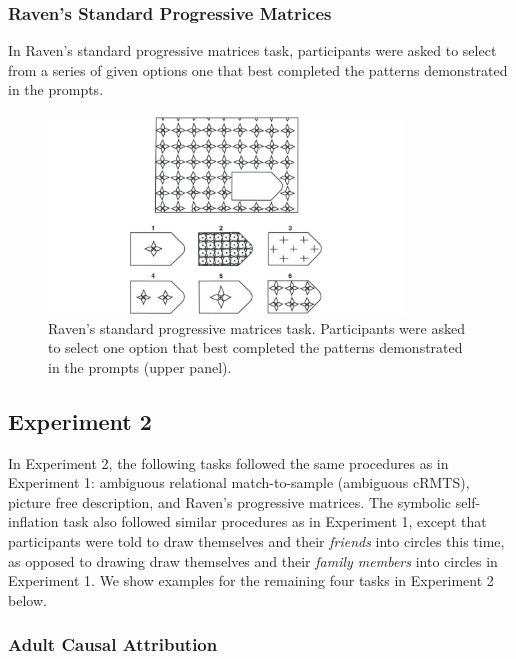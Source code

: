 \documentclass[
  man,floatsintext]{apa6}
\begin{document}
\hypertarget{ravens-standard-progressive-matrices-3}{%
\subsubsection{Raven's Standard Progressive Matrices}\label{ravens-standard-progressive-matrices-3}}

In Raven's standard progressive matrices task, participants were asked to select from a series of given options one that best completed the patterns demonstrated in the prompts.

\begin{figure}[!h]

{\centering \includegraphics[width=1\linewidth,height=200px]{CCRR_manuscript_files/appendix_task_examples/e1_raven} 

}

\caption{Raven's standard progressive matrices task. Participants were asked to select one option that best completed the patterns demonstrated in the prompts (upper panel).}\label{fig:raven}
\end{figure}

\hypertarget{experiment-2-2}{%
\subsection{Experiment 2}\label{experiment-2-2}}

In Experiment 2, the following tasks followed the same procedures as in Experiment 1: ambiguous relational match-to-sample (ambiguous cRMTS), picture free description, and Raven's progressive matrices. The symbolic self-inflation task also followed similar procedures as in Experiment 1, except that participants were told to draw themselves and their \emph{friends} into circles this time, as opposed to drawing draw themselves and their \emph{family members} into circles in Experiment 1. We show examples for the remaining four tasks in Experiment 2 below.

\hypertarget{adult-causal-attribution-2}{%
\subsubsection{Adult Causal Attribution}\label{adult-causal-attribution-2}}
\end{document}
